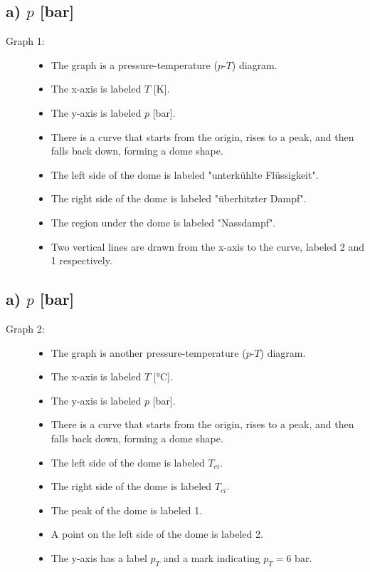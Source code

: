 \subsection*{a) $p$ [bar]}

\begin{description}
    \item[Graph 1:] 
    \begin{itemize}
        \item The graph is a pressure-temperature ($p$-$T$) diagram.
        \item The x-axis is labeled $T$ [K].
        \item The y-axis is labeled $p$ [bar].
        \item There is a curve that starts from the origin, rises to a peak, and then falls back down, forming a dome shape.
        \item The left side of the dome is labeled "unterkühlte Flüssigkeit".
        \item The right side of the dome is labeled "überhitzter Dampf".
        \item The region under the dome is labeled "Nassdampf".
        \item Two vertical lines are drawn from the x-axis to the curve, labeled 2 and 1 respectively.
    \end{itemize}
\end{description}

\subsection*{a) $p$ [bar]}

\begin{description}
    \item[Graph 2:] 
    \begin{itemize}
        \item The graph is another pressure-temperature ($p$-$T$) diagram.
        \item The x-axis is labeled $T$ [°C].
        \item The y-axis is labeled $p$ [bar].
        \item There is a curve that starts from the origin, rises to a peak, and then falls back down, forming a dome shape.
        \item The left side of the dome is labeled $T_{ci}$.
        \item The right side of the dome is labeled $T_{ci}$.
        \item The peak of the dome is labeled 1.
        \item A point on the left side of the dome is labeled 2.
        \item The y-axis has a label $p_T$ and a mark indicating $p_T = 6 \text{ bar}$.
    \end{itemize}
\end{description}

